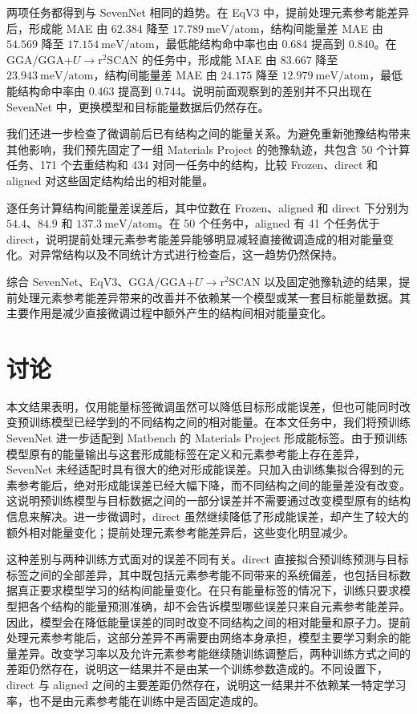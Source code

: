 \documentclass[UTF8,a4paper,12pt,fontset=fandol]{ctexart}
\begin{document}
两项任务都得到与 SevenNet 相同的趋势。在 EqV3 中，提前处理元素参考能差异后，形成能 MAE 由 \(62.384\) 降至 \(17.789~\mathrm{meV/atom}\)，结构间能量差 MAE 由 \(54.569\) 降至 \(17.154~\mathrm{meV/atom}\)，最低能结构命中率也由 0.684 提高到 0.840。在 GGA/GGA+$U$$\rightarrow$r$^2$SCAN 的任务中，形成能 MAE 由 \(83.667\) 降至 \(23.943~\mathrm{meV/atom}\)，结构间能量差 MAE 由 \(24.175\) 降至 \(12.979~\mathrm{meV/atom}\)，最低能结构命中率由 0.463 提高到 0.744。说明前面观察到的差别并不只出现在 SevenNet 中，更换模型和目标能量数据后仍然存在。

我们还进一步检查了微调前后已有结构之间的能量关系。为避免重新弛豫结构带来其他影响，我们预先固定了一组 Materials Project 的弛豫轨迹，共包含 50 个计算任务、171 个去重结构和 434 对同一任务中的结构，比较 Frozen、direct 和 aligned 对这些固定结构给出的相对能量。

逐任务计算结构间能量差误差后，其中位数在 Frozen、aligned 和 direct 下分别为 \(54.4\)、\(84.9\) 和 \(137.3~\mathrm{meV/atom}\)。在 50 个任务中，aligned 有 41 个任务优于 direct，说明提前处理元素参考能差异能够明显减轻直接微调造成的相对能量变化。对异常结构以及不同统计方式进行检查后，这一趋势仍然保持。

综合 SevenNet、EqV3、GGA/GGA+$U$$\rightarrow$r$^2$SCAN 以及固定弛豫轨迹的结果，提前处理元素参考能差异带来的改善并不依赖某一个模型或某一套目标能量数据。其主要作用是减少直接微调过程中额外产生的结构间相对能量变化。

\section{讨论}

本文结果表明，仅用能量标签微调虽然可以降低目标形成能误差，但也可能同时改变预训练模型已经学到的不同结构之间的相对能量。在本文任务中，我们将预训练 SevenNet 进一步适配到 Matbench 的 Materials Project 形成能标签。由于预训练模型原有的能量输出与这套形成能标签在定义和元素参考能上存在差异，SevenNet 未经适配时具有很大的绝对形成能误差。只加入由训练集拟合得到的元素参考能后，绝对形成能误差已经大幅下降，而不同结构之间的能量差没有改变。这说明预训练模型与目标数据之间的一部分误差并不需要通过改变模型原有的结构信息来解决。进一步微调时，direct 虽然继续降低了形成能误差，却产生了较大的额外相对能量变化；提前处理元素参考能差异后，这些变化明显减少。

这种差别与两种训练方式面对的误差不同有关。direct 直接拟合预训练预测与目标标签之间的全部差异，其中既包括元素参考能不同带来的系统偏差，也包括目标数据真正要求模型学习的结构间能量变化。在只有能量标签的情况下，训练只要求模型把各个结构的能量预测准确，却不会告诉模型哪些误差只来自元素参考能差异。因此，模型会在降低能量误差的同时改变不同结构之间的相对能量和原子力。提前处理元素参考能后，这部分差异不再需要由网络本身承担，模型主要学习剩余的能量差异。改变学习率以及允许元素参考能继续随训练调整后，两种训练方式之间的差距仍然存在，说明这一结果并不是由某一个训练参数造成的。不同设置下，direct 与 aligned 之间的主要差距仍然存在，说明这一结果并不依赖某一特定学习率，也不是由元素参考能在训练中是否固定造成的。
\end{document}

